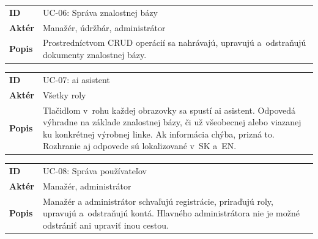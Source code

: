 \vspace{6pt}\noindent
\begin{tabularx}{\textwidth}{@{}l X@{}}
      \toprule
      \textbf{ID}    & UC-06: Správa znalostnej bázy                                                               \\
      \textbf{Aktér} & Manažér, údržbár, administrátor                                                                      \\
      \textbf{Popis} & Prostredníctvom CRUD operácií sa nahrávajú, upravujú a~odstraňujú dokumenty znalostnej bázy. \\
      \bottomrule
\end{tabularx}

\vspace{6pt}\noindent
\begin{tabularx}{\textwidth}{@{}l X@{}}
      \toprule
      \textbf{ID}    & UC-07: \acrshort{ai} asistent                                                                                                                                                       \\
      \textbf{Aktér} & Všetky roly                                                                                                                                                               \\
      \textbf{Popis} & Tlačidlom v~rohu každej obrazovky sa spustí \acrshort{ai} asistent.
      Odpovedá výhradne na základe znalostnej bázy, či už všeobecnej alebo viazanej ku konkrétnej výrobnej linke. Ak informácia chýba, prizná to. Rozhranie aj odpovede sú lokalizované v~SK a~EN. \\
      \bottomrule
\end{tabularx}

\vspace{6pt}\noindent
\begin{tabularx}{\textwidth}{@{}l X@{}}
      \toprule
      \textbf{ID}    & UC-08: Správa používateľov                                                                                                                          \\
      \textbf{Aktér} & Manažér, administrátor                                                                                                                                      \\
      \textbf{Popis} & Manažér a administrátor schvaľujú registrácie, priraďujú roly, upravujú a~odstraňujú kontá. Hlavného administrátora nie je možné odstrániť ani upraviť inou cestou. \\
      \bottomrule
\end{tabularx}

